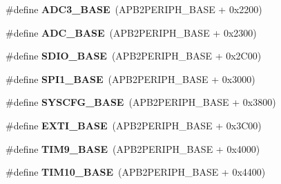 \begin{DoxyCompactItemize}
\item 
\#define {\bfseries A\+D\+C3\+\_\+\+B\+A\+SE}~(A\+P\+B2\+P\+E\+R\+I\+P\+H\+\_\+\+B\+A\+SE + 0x2200)\hypertarget{group___peripheral__memory__map_gaca766f86c8e0b00a8e2b0224dcbb4c82}{}\label{group___peripheral__memory__map_gaca766f86c8e0b00a8e2b0224dcbb4c82}

\item 
\#define {\bfseries A\+D\+C\+\_\+\+B\+A\+SE}~(A\+P\+B2\+P\+E\+R\+I\+P\+H\+\_\+\+B\+A\+SE + 0x2300)\hypertarget{group___peripheral__memory__map_gad06cb9e5985bd216a376f26f22303cd6}{}\label{group___peripheral__memory__map_gad06cb9e5985bd216a376f26f22303cd6}

\item 
\#define {\bfseries S\+D\+I\+O\+\_\+\+B\+A\+SE}~(A\+P\+B2\+P\+E\+R\+I\+P\+H\+\_\+\+B\+A\+SE + 0x2\+C00)\hypertarget{group___peripheral__memory__map_ga95dd0abbc6767893b4b02935fa846f52}{}\label{group___peripheral__memory__map_ga95dd0abbc6767893b4b02935fa846f52}

\item 
\#define {\bfseries S\+P\+I1\+\_\+\+B\+A\+SE}~(A\+P\+B2\+P\+E\+R\+I\+P\+H\+\_\+\+B\+A\+SE + 0x3000)\hypertarget{group___peripheral__memory__map_ga50cd8b47929f18b05efbd0f41253bf8d}{}\label{group___peripheral__memory__map_ga50cd8b47929f18b05efbd0f41253bf8d}

\item 
\#define {\bfseries S\+Y\+S\+C\+F\+G\+\_\+\+B\+A\+SE}~(A\+P\+B2\+P\+E\+R\+I\+P\+H\+\_\+\+B\+A\+SE + 0x3800)\hypertarget{group___peripheral__memory__map_ga62246020bf3b34b6a4d8d0e84ec79d3d}{}\label{group___peripheral__memory__map_ga62246020bf3b34b6a4d8d0e84ec79d3d}

\item 
\#define {\bfseries E\+X\+T\+I\+\_\+\+B\+A\+SE}~(A\+P\+B2\+P\+E\+R\+I\+P\+H\+\_\+\+B\+A\+SE + 0x3\+C00)\hypertarget{group___peripheral__memory__map_ga87371508b3bcdcd98cd1ec629be29061}{}\label{group___peripheral__memory__map_ga87371508b3bcdcd98cd1ec629be29061}

\item 
\#define {\bfseries T\+I\+M9\+\_\+\+B\+A\+SE}~(A\+P\+B2\+P\+E\+R\+I\+P\+H\+\_\+\+B\+A\+SE + 0x4000)\hypertarget{group___peripheral__memory__map_ga92ae902be7902560939223dd765ece08}{}\label{group___peripheral__memory__map_ga92ae902be7902560939223dd765ece08}

\item 
\#define {\bfseries T\+I\+M10\+\_\+\+B\+A\+SE}~(A\+P\+B2\+P\+E\+R\+I\+P\+H\+\_\+\+B\+A\+SE + 0x4400)\hypertarget{group___peripheral__memory__map_ga3eff32f3801db31fb4b61d5618cad54a}{}\label{group___peripheral__memory__map_ga3eff32f3801db31fb4b61d5618cad54a}


\end{DoxyCompactItemize}

